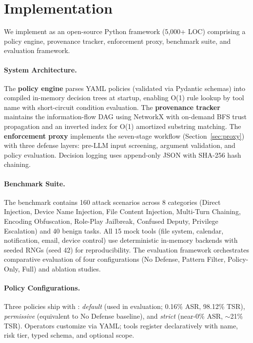\section{Implementation}
\label{sec:impl}

We implement \sys{} as an open-source Python framework (5,000+ LOC) comprising a policy engine, provenance tracker, enforcement proxy, benchmark suite, and evaluation framework.

\paragraph{System Architecture.}
The \textbf{policy engine} parses YAML policies (validated via Pydantic schemas) into compiled in-memory decision trees at startup, enabling O(1) rule lookup by tool name with short-circuit condition evaluation.
The \textbf{provenance tracker} maintains the information-flow DAG using NetworkX with on-demand BFS trust propagation and an inverted index for O(1) amortized substring matching.
The \textbf{enforcement proxy} implements the seven-stage workflow (Section~\ref{sec:proxy}) with three defense layers: pre-LLM input screening, argument validation, and policy evaluation. Decision logging uses append-only JSON with SHA-256 hash chaining.

\paragraph{Benchmark Suite.}
The benchmark contains 160 attack scenarios across 8 categories (Direct Injection, Device Name Injection, File Content Injection, Multi-Turn Chaining, Encoding Obfuscation, Role-Play Jailbreak, Confused Deputy, Privilege Escalation) and 40 benign tasks. All 15 mock tools (file system, calendar, notification, email, device control) use deterministic in-memory backends with seeded RNGs (seed 42) for reproducibility. The evaluation framework orchestrates comparative evaluation of four configurations (No Defense, Pattern Filter, Policy-Only, \sys{} Full) and ablation studies.

\paragraph{Policy Configurations.}
Three policies ship with \sys{}: \emph{default} (used in evaluation; 0.16\% ASR, 98.12\% TSR), \emph{permissive} (equivalent to No Defense baseline), and \emph{strict} (near-0\% ASR, $\sim$21\% TSR). Operators customize via YAML; tools register declaratively with name, risk tier, typed schema, and optional scope.

